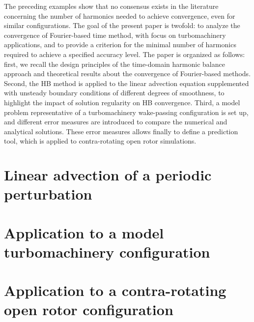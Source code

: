 {The preceding examples show that no consensus exists in the literature 
concerning the number of harmonics needed to achieve convergence,
even for similar configurations.
The goal of the present paper is twofold: to analyze the
convergence of Fourier-based time method, with focus on turbomachinery applications, 
and to provide a criterion for the minimal number of harmonics 
required to achieve a specified accuracy level. The paper is organized as follows: first,
we recall the design principles of the time-domain harmonic balance 
approach and theoretical results about the convergence of Fourier-based methods.
Second, the HB method is applied to the linear advection equation 
supplemented with unsteady boundary conditions of different degrees of smoothness,
to highlight the impact of solution regularity on HB convergence. 
Third, a model problem representative of a turbomachinery wake-passing 
configuration is set up, and different
error measures are introduced to compare the numerical and analytical solutions. 
These error measures allows finally to define a prediction tool, 
which is applied to contra-rotating open rotor simulations.
}

\minitoc
\newpage

\section{Linear advection of a periodic perturbation}
\label{sec:convergence_advection}


\section{Application to a model turbomachinery configuration}
\label{sec:rotating_blocks}


\section{Application to a contra-rotating open rotor configuration}
\label{sec:CROR}


